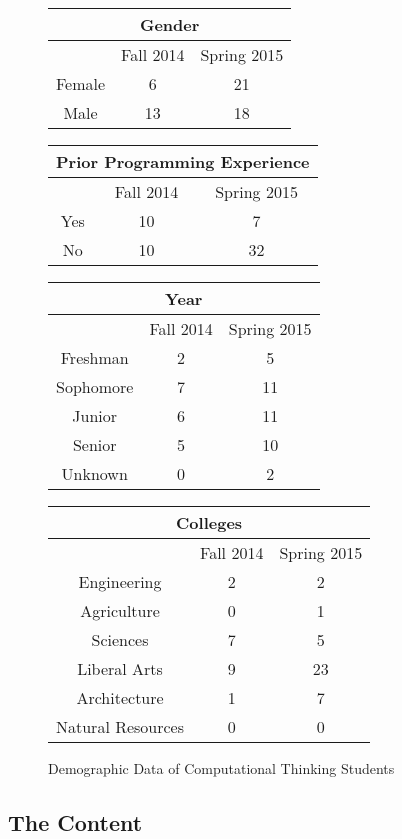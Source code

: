 \begin{figure*}
\begin{minipage}{\linewidth}
\centering
	\begin{tabular}{c|c|c}
	  \multicolumn{3}{c}{Gender}\\\hline
		& Fall 2014 & Spring 2015 \\\hline
		Female & 6 & 21 \\
		Male & 13 & 18 \\
	\end{tabular}
\centering
	\begin{tabular}{c|c|c}
	  \multicolumn{3}{c}{Prior Programming Experience}\\\hline
		& Fall 2014 & Spring 2015 \\\hline
		Yes & 10 & 7 \\
		No & 10 & 32 \\
	\end{tabular}
\centering
	\begin{tabular}{c|c|c}
		\multicolumn{3}{c}{Year}\\\hline
		& Fall 2014 & Spring 2015 \\\hline
		Freshman & 2 & 5 \\
		Sophomore & 7 & 11 \\
		Junior & 6 & 11 \\
		Senior & 5 & 10 \\
		Unknown & 0 & 2 \\
	\end{tabular}
\centering	
	\begin{tabular}{c|c|c}
	  \multicolumn{3}{c}{Colleges}\\\hline
		& Fall 2014 & Spring 2015 \\\hline
		Engineering & 2 & 2 \\
		Agriculture & 0 & 1 \\
		Sciences & 7 & 5 \\
		Liberal Arts & 9 & 23 \\
		Architecture & 1 & 7 \\
		Natural Resources & 0 & 0 \\
	\end{tabular}
\end{minipage}
\caption{Demographic Data of Computational Thinking Students}
\label{data-demographics}
\end{figure*}


\subsection{The Content}

